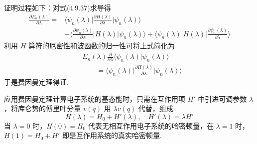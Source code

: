 证明过程如下：对式(4.9.37)求导得
\begin{equation}
\begin{aligned}
  \frac{\partial E_{n}(\lambda)}{\partial\lambda}
  ={}&\bigg\langle\psi_{n}(\lambda)\bigg|
  \frac{\partial H(\lambda)}{\partial\lambda}\bigg|\psi_{n}(\lambda)\bigg\rangle\\
  &+\bigg\langle\frac{\partial\psi_{n}(\lambda)}{\partial\lambda}
  \bigg|H(\lambda)\bigg|\psi_{n}(\lambda)\bigg\rangle
  +\bigg\langle\psi_{n}(\lambda)\bigg|H(\lambda)\bigg|
  \frac{\partial\psi_{n}(\lambda)}{\partial\lambda}\bigg\rangle
\end{aligned}
\end{equation}
利用 $H$ 算符的厄密性和波函数的归一性可将上式简化为
\begin{equation}
\begin{aligned}
  &E_{n}(\lambda)\frac{\partial}{\partial\lambda}
  \langle\psi_{n}(\lambda)|\psi_{n}(\lambda)\rangle\\
  &\qquad=\bigg\langle\psi_{n}(\lambda)\bigg|
  \frac{\partial H(\lambda)}{\partial\lambda}\bigg|\psi_{n}(\lambda)\bigg\rangle
\end{aligned}
\end{equation}
于是费因曼定理得证.

应用费因曼定理计算电子系统的基态能时，只需在互作用项 $H'$ 中引进可调参数 $\lambda$，将库仑势的傅里叶分量 $v(q)$ 用 $\lambda v(q)$ 代替，组成
\begin{equation}
  H(\lambda)=H_{0}+H'(\lambda),\quad H'(\lambda)=\lambda H'
\end{equation}
当 $\lambda=0$ 时，$H(0)=H_{0}$ 代表无相互作用电子系统的哈密顿量，在 $\lambda=1$ 时，$H(1)=H_{0}+H'$ 即是互作用系统的真实哈密顿量.

